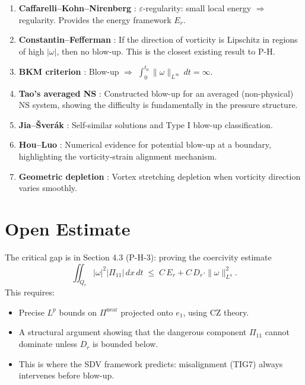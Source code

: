 \documentclass[11pt]{article}
\theoremstyle{definition}
\begin{document}
\begin{enumerate}
  \item \textbf{Caffarelli--Kohn--Nirenberg} \cite{CKN}: $\varepsilon$-regularity: small local energy $\Rightarrow$ regularity.  Provides the energy framework $E_r$.
  \item \textbf{Constantin--Fefferman} \cite{CF}: If the direction of vorticity is Lipschitz in regions of high $|\omega|$, then no blow-up.  This is the closest existing result to P-H.
  \item \textbf{BKM criterion} \cite{BKM}: Blow-up $\Rightarrow$ $\int_0^{t_0} \|\omega\|_{L^\infty}\, dt = \infty$.
  \item \textbf{Tao's averaged NS} \cite{Tao}: Constructed blow-up for an averaged (non-physical) NS system, showing the difficulty is fundamentally in the pressure structure.
  \item \textbf{Jia--\v{S}ver\'ak} \cite{JS}: Self-similar solutions and Type I blow-up classification.
  \item \textbf{Hou--Luo} \cite{HL}: Numerical evidence for potential blow-up at a boundary, highlighting the vorticity-strain alignment mechanism.
  \item \textbf{Geometric depletion} \cite{CF2}: Vortex stretching depletion when vorticity direction varies smoothly.
\end{enumerate}

\section{Open Estimate}

The critical gap is in Section 4.3 (P-H-3): proving the coercivity estimate
\[
  \iint_{Q_r} |\omega|^2 |\Pi_{11}|\, dx\, dt \;\leq\; C\, E_r + C\, D_r \cdot \|\omega\|_{L^4}^2.
\]
This requires:
\begin{itemize}
  \item Precise $L^p$ bounds on $\Pi^{\mathrm{near}}$ projected onto $e_1$, using CZ theory.
  \item A structural argument showing that the dangerous component $\Pi_{11}$ cannot dominate unless $D_r$ is bounded below.
  \item This is where the SDV framework predicts: misalignment (TIG7) always intervenes before blow-up.
\end{itemize}

\end{document}
